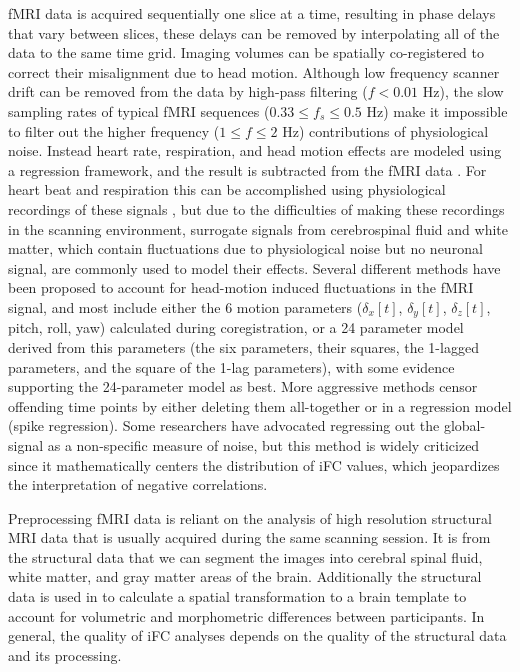 fMRI data is acquired sequentially one slice at a time, resulting in phase delays that vary between slices, these delays can be removed by interpolating all of the data to the same time grid. Imaging volumes can be spatially co-registered to correct their misalignment due to head motion. Although low frequency scanner drift can be removed from the data by high-pass filtering ($f<0.01$  \si{\hertz}), the slow sampling rates of typical fMRI sequences ($0.33 \leq f_s \leq 0.5$ \si{\hertz}) make it impossible to filter out the higher frequency ($1 \leq f \leq 2$ \si{\hertz}) contributions of physiological noise. Instead heart rate, respiration, and head motion effects are modeled using a regression framework, and the result is subtracted from the fMRI data \cite{lund_nvr}. For heart beat and respiration this can be accomplished using physiological recordings of these signals \cite{Hu1999,Glover2002}, but due to the difficulties of making these recordings in the scanning environment, surrogate signals from cerebrospinal fluid and white matter\cite{fox2005}, which contain fluctuations due to physiological noise but no neuronal signal, are commonly used to model their effects. Several different methods have been proposed to account for head-motion induced fluctuations in the fMRI signal, and most include either the 6 motion parameters ($\delta_{x}[t]$, $\delta_{y}[t]$, $\delta_{z}[t]$, pitch, roll, yaw) calculated during coregistration\cite{fox2005}, or a 24 parameter model derived from this parameters (the six parameters, their squares, the 1-lagged parameters, and the square of the 1-lag parameters)\cite{friston1996}, with some evidence supporting the 24-parameter model as best\cite{Yan2013, Satterthwaite2013}. More aggressive methods censor offending time points by either deleting them all-together\cite{Power2012} or in a regression model (spike regression)\cite{gabrieli_whitefield}. Some researchers have advocated regressing out the global-signal as a non-specific measure of noise\cite{fox_response}, but this method is widely criticized since it mathematically centers the distribution of iFC values, which jeopardizes the interpretation of negative correlations\cite{Murphy, Saad}.  

Preprocessing fMRI data is reliant on the analysis of high resolution structural MRI data that is usually acquired during the same scanning session. It is from the structural data that we can segment the images into cerebral spinal fluid, white matter, and gray matter areas of the brain. Additionally the structural data is used in to calculate a spatial transformation to a brain template to account for volumetric and morphometric differences between participants. In general, the quality of iFC analyses depends on the quality of the structural data and its processing.

